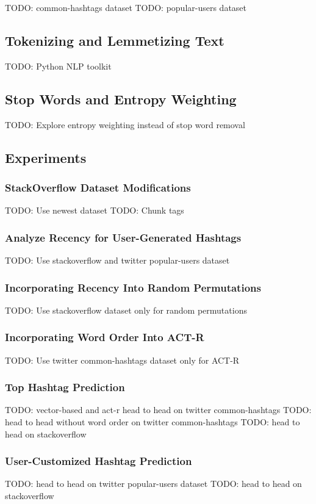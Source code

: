 \documentclass[man]{apa6}
\begin{document}
TODO: common-hashtags dataset
TODO: popular-users dataset

\subsection{Tokenizing and Lemmetizing Text}

TODO: Python NLP toolkit \cite{Bird2009}

\subsection{Stop Words and Entropy Weighting}

TODO: Explore entropy weighting instead of stop word removal \cite{Dumais1991}

\subsection{Experiments}

\subsubsection{StackOverflow Dataset Modifications}

TODO: Use newest dataset
TODO: Chunk tags

\subsubsection{Analyze Recency for User-Generated Hashtags}

TODO: Use stackoverflow and twitter popular-users dataset

\subsubsection{Incorporating Recency Into Random Permutations}

TODO: Use stackoverflow dataset only for random permutations

\subsubsection{Incorporating Word Order Into ACT-R}

TODO: Use twitter common-hashtags dataset only for ACT-R

\subsubsection{Top Hashtag Prediction}

TODO: vector-based and act-r head to head on twitter common-hashtags
TODO: head to head without word order on twitter common-hashtags
TODO: head to head on stackoverflow

\subsubsection{User-Customized Hashtag Prediction}

TODO: head to head on twitter popular-users dataset
TODO: head to head on stackoverflow


\printbibliography
\end{document}

